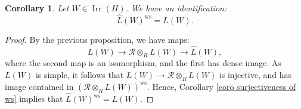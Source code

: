 \documentclass{amsart}
\newtheorem{coro}[defi]{Corollary}
\begin{document}
\begin{coro}\label{coro ws of simple modules}
Let $W\in \operatorname{Irr}(H)$. We have an identification: 
\begin{equation*}
    \widehat{L}(W)^{\operatorname{ws}}=L(W).
\end{equation*}
\end{coro}
\begin{proof}
By the previous proposition, we have maps:
\begin{equation*}
    L(W)\rightarrow\mathscr{R}\otimes_{R}L(W)\rightarrow \widehat{L}(W),
\end{equation*}
where the second map is an isomorphism, and the first has dense image. As $L(W)$ is simple, it follows that $L(W)\rightarrow \mathscr{R}\otimes_{R}L(W)$ is injective, and has image contained in $(\mathscr{R}\otimes_{R}L(W))^{\operatorname{ws}}$. Hence, Corollary \ref{coro surjectiveness of ws} implies that $\widehat{L}(W)^{\operatorname{ws}}=L(W)$.
\end{proof}
\end{document}
